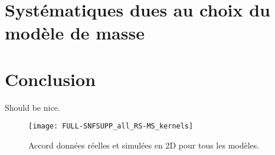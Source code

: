 \documentclass[../main/main.tex]{subfiles}
\begin{document}
\section{Systématiques dues au choix du modèle de masse}\label{sec:modsys}


\section{Conclusion}\label{sec:simccl}

Should be nice.

\begin{figure}[p]
    \centering
    \texttt{[image: FULL-SNFSUPP\_all\_RS-MS\_kernels]}
    \caption[Ajustement en 2D pour tous les modèles]{Accord données réelles et
    simulées en 2D pour tous les modèles.}
    \label{fig:2dhexall}
\end{figure}

\clearpage

\thispagestyle{plain}
\vfill
\minilof
\vfill
\minilot
\vfill


\shorthandoff{:}

\end{document}
